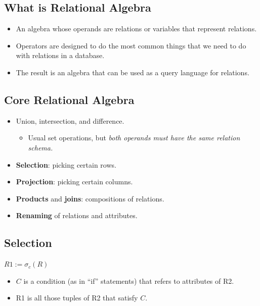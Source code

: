 \documentclass[a4paper]{article}
\begin{document}
        \subsection{What is Relational Algebra}
                \begin{itemize}
                    \item An algebra whose operands are relations or variables that represent relations.
                    \item Operators are designed to do the most common things that we need to do with relations in a database.
                    \item The result is an algebra that can be used as a query language for relations.
                
                \end{itemize}
        \subsection{Core Relational Algebra}
            \begin{itemize}
                \item Union, intersection, and difference.
                    \begin{itemize}
                        \item Usual set operations, but \textit{both operands must have the same relation schema.}
                    \end{itemize}
                \item \textbf{Selection}: picking certain rows.
                \item \textbf{Projection}: picking certain columns.
                \item \textbf{Products} and \textbf{joins}: compositions of relations.
                \item \textbf{Renaming} of relations and attributes.
            \end{itemize}

        \subsection{Selection}
        \begin{center}
            $R1:= \sigma_{c}(R)$
        \end{center}
            \begin{itemize}
                \item $C$ is a condition (as in “if” statements) that refers to attributes 
of R2.
                \item R1 is all those tuples of R2 that satisfy 
$C$.
            \end{itemize}
\end{document}
